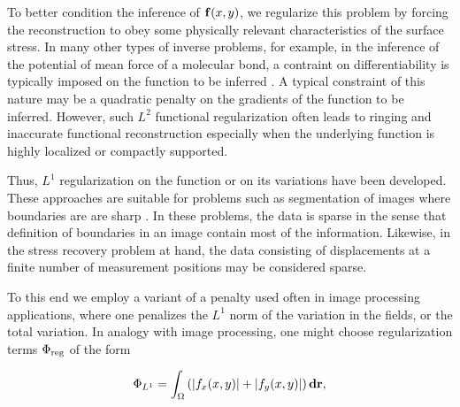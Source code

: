 \documentclass[aps,prl,reprint,twocolumn,groupedaddress,showpacs]{revtex4}
\def\d{{\bf d}}
\def\f{{\bf f}}
\def\r{{\bf r}}
\begin{document}
To better condition the inference of $\f(x,y)$, we regularize
this problem by forcing the reconstruction to obey some physically
relevant characteristics of the surface stress. In many other types of
inverse problems, for example, in the inference of the potential of
mean force of a molecular bond, a contraint on differentiability is
typically imposed on the function to be inferred \cite{PATHDFS}. A
typical constraint of this nature may be a quadratic penalty on the
gradients of the function to be inferred.  However, such $L^{2}$
functional regularization often leads to ringing and inaccurate
functional reconstruction especially when the underlying function is
highly localized or compactly supported.

Thus, $L^{1}$ regularization on the function or on its variations have
been developed.  These approaches are suitable for problems such as
segmentation of images where boundaries are are sharp \cite{CHAN}.  In
these problems, the data is sparse in the sense that definition of
boundaries in an image contain most of the information.  Likewise, in
the stress recovery problem at hand, the data consisting of
displacements at a finite number of measurement positions may be
considered sparse.


To this end we employ a variant of a penalty used often in
image processing applications, where one penalizes the $L^1$
norm of the variation in the fields, or the total variation.
In analogy with image processing, one might choose regularization terms 
$\Phi_{\rm reg}$ of the form

\begin{equation}
\Phi_{L^{1}} = \int_\Omega \left(\vert f_{x}(x,y)\vert  +\vert f_{y}(x,y)\vert\right) \d\r,
\label{L10}
\end{equation} 
\end{document}
